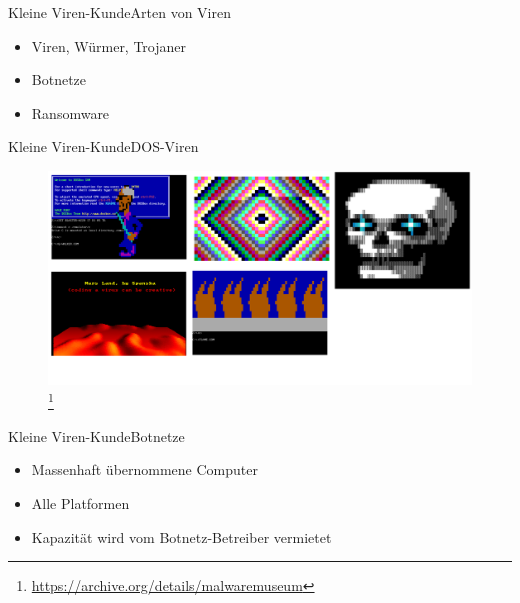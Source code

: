 \documentclass[10pt]{beamer}
\begin{document}
\begin{frame}{Kleine Viren-Kunde}{Arten von Viren}
\begin{itemize}
	\item Viren, Würmer, Trojaner
	\item Botnetze
	\item Ransomware
\end{itemize}
\end{frame}

\begin{frame}{Kleine Viren-Kunde}{DOS-Viren}
	\begin{figure}[p]
		\centering
		\includegraphics[scale=0.11]{dos_viruses.png}
		\let\thefootnote\relax\footnote{\url{https://archive.org/details/malwaremuseum}}
	\end{figure}
\end{frame}


\begin{frame}{Kleine Viren-Kunde}{Botnetze}
	\begin{itemize}
		\item Massenhaft übernommene Computer
		\item Alle Platformen
		\item Kapazität wird vom Botnetz-Betreiber vermietet
	\end{itemize}
\end{frame}
\end{document}
